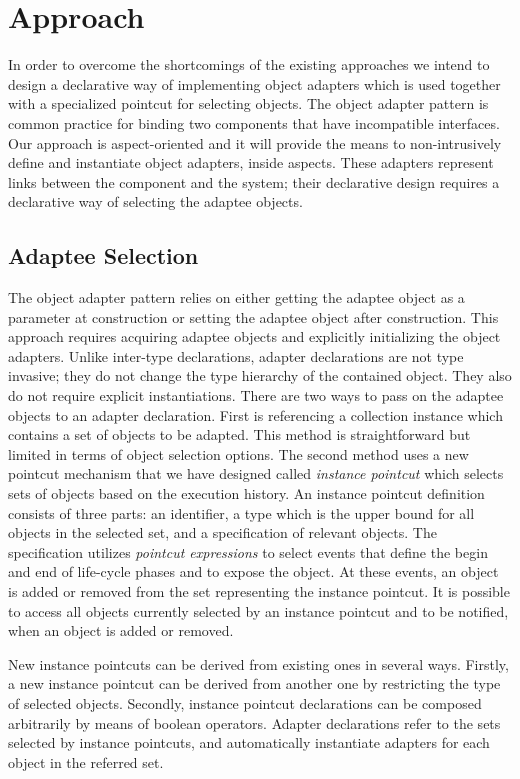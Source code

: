 \documentclass{acm_proc_article-sp}
\begin{document}
\section{Approach}
In order to overcome the shortcomings of the existing approaches we intend to design a declarative way of implementing object adapters which is used together with a specialized pointcut for selecting objects. The object adapter pattern is common practice for binding two components that have incompatible interfaces. Our approach is aspect-oriented and it will provide the means to non-intrusively define and instantiate object adapters, inside aspects. These adapters represent links between the component and the system; their declarative design requires a declarative way of selecting the adaptee objects. 

\subsection{Adaptee Selection}
The object adapter pattern relies on either getting the adaptee object as a parameter at construction or setting the adaptee object after construction. This approach requires acquiring adaptee objects and explicitly initializing the object adapters. 
Unlike inter-type declarations, adapter declarations are not type invasive; they do not change the type hierarchy of the contained object. They also do not require explicit instantiations. 
There are two ways to pass on the adaptee objects to an adapter declaration. First is referencing a collection instance which contains a set of objects to be adapted. This method is straightforward but limited in terms of object selection options.
The second method uses a new pointcut mechanism that we have designed called \emph{instance pointcut} which selects sets of objects based on the execution history.
An instance pointcut definition consists of three parts: an identifier, a type which is the upper bound for all objects in the selected set, and a specification of relevant objects.
The specification utilizes \emph{pointcut expressions} to select events that define the begin and end of life-cycle phases and to expose the object.
At these events, an object is added or removed from the set representing the instance pointcut.
It is possible to access all objects currently selected by an instance pointcut and to
be notified, when an object is added or removed.

New instance pointcuts can be derived from existing ones in several ways. Firstly, a new instance pointcut can be derived from another one by restricting the type of selected objects. Secondly, instance pointcut declarations can be composed arbitrarily by means of boolean operators. Adapter declarations refer to the sets selected by instance pointcuts, and automatically instantiate adapters for each object in the referred set.
\end{document}
